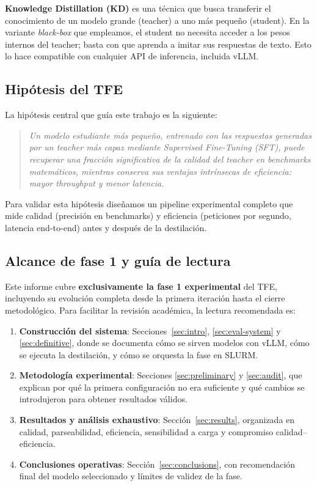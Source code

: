 \documentclass[11pt,a4paper]{article}
\begin{document}
\textbf{Knowledge Distillation (KD)} es una t\'ecnica que busca
transferir el conocimiento de un modelo grande (teacher) a uno m\'as
peque\~no (student). En la variante \emph{black-box} que empleamos, el
student no necesita acceder a los pesos internos del teacher; basta con
que aprenda a imitar sus respuestas de texto. Esto lo hace compatible
con cualquier API de inferencia, incluida vLLM.

\subsection{Hip\'otesis del TFE}

La hip\'otesis central que gu\'ia este trabajo es la siguiente:

\begin{quote}
\emph{Un modelo estudiante m\'as peque\~no, entrenado con las respuestas
generadas por un teacher m\'as capaz mediante Supervised Fine-Tuning
(SFT), puede recuperar una fracci\'on significativa de la calidad del
teacher en benchmarks matem\'aticos, mientras conserva sus ventajas
intr\'insecas de eficiencia: mayor throughput y menor latencia.}
\end{quote}

Para validar esta hip\'otesis dise\~namos un pipeline experimental
completo que mide calidad (precisi\'on en benchmarks) y eficiencia
(peticiones por segundo, latencia end-to-end) antes y despu\'es de la
destilaci\'on.

\subsection{Alcance de fase 1 y gu\'ia de lectura}

Este informe cubre \textbf{exclusivamente la fase 1 experimental} del
TFE, incluyendo su evoluci\'on completa desde la primera iteraci\'on hasta
el cierre metodol\'ogico. Para facilitar la revisi\'on acad\'emica, la
lectura recomendada es:

\begin{enumerate}
  \item \textbf{Construcci\'on del sistema}: Secciones~\ref{sec:intro},
    \ref{sec:eval-system} y \ref{sec:definitive}, donde se documenta
    c\'omo se sirven modelos con vLLM, c\'omo se ejecuta la destilaci\'on,
    y c\'omo se orquesta la fase en SLURM.
  \item \textbf{Metodolog\'ia experimental}: Secciones
    \ref{sec:preliminary} y \ref{sec:audit}, que explican por qu\'e la
    primera configuraci\'on no era suficiente y qu\'e cambios se
    introdujeron para obtener resultados v\'alidos.
  \item \textbf{Resultados y an\'alisis exhaustivo}:
    Secci\'on~\ref{sec:results}, organizada en calidad, parseabilidad,
    eficiencia, sensibilidad a carga y compromiso calidad--eficiencia.
  \item \textbf{Conclusiones operativas}:
    Secci\'on~\ref{sec:conclusions}, con recomendaci\'on final del modelo
    seleccionado y l\'imites de validez de la fase.
\end{enumerate}
\end{document}
